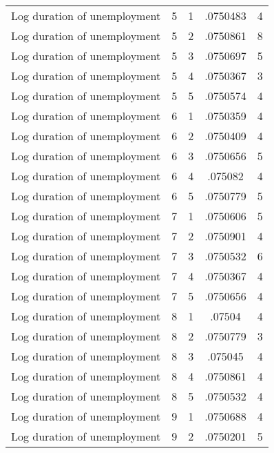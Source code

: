 \begin{tabular}{l*{4}{c}}
Log duration of unemployment&           5&           1&    .0750483&           4\\
Log duration of unemployment&           5&           2&    .0750861&           8\\
Log duration of unemployment&           5&           3&    .0750697&           5\\
Log duration of unemployment&           5&           4&    .0750367&           3\\
Log duration of unemployment&           5&           5&    .0750574&           4\\
Log duration of unemployment&           6&           1&    .0750359&           4\\
Log duration of unemployment&           6&           2&    .0750409&           4\\
Log duration of unemployment&           6&           3&    .0750656&           5\\
Log duration of unemployment&           6&           4&     .075082&           4\\
Log duration of unemployment&           6&           5&    .0750779&           5\\
Log duration of unemployment&           7&           1&    .0750606&           5\\
Log duration of unemployment&           7&           2&    .0750901&           4\\
Log duration of unemployment&           7&           3&    .0750532&           6\\
Log duration of unemployment&           7&           4&    .0750367&           4\\
Log duration of unemployment&           7&           5&    .0750656&           4\\
Log duration of unemployment&           8&           1&      .07504&           4\\
Log duration of unemployment&           8&           2&    .0750779&           3\\
Log duration of unemployment&           8&           3&     .075045&           4\\
Log duration of unemployment&           8&           4&    .0750861&           4\\
Log duration of unemployment&           8&           5&    .0750532&           4\\
Log duration of unemployment&           9&           1&    .0750688&           4\\
Log duration of unemployment&           9&           2&    .0750201&           5\\

\end{tabular}
